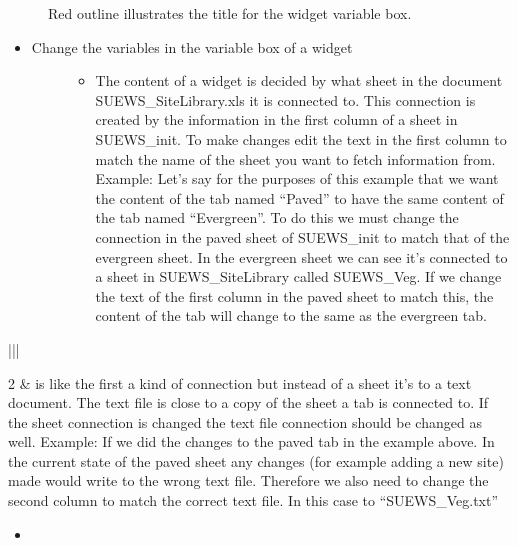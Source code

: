 \documentclass[letterpaper,10pt,english]{sphinxmanual}
\begin{document}
\begin{figure}[htbp]
\centering
\capstart

\noindent{}
\caption{Red outline illustrates the title for the widget variable box.}\label{\detokenize{DevelopmentGuidelines:id6}}\end{figure}
\begin{itemize}
\item {} \begin{description}
\item[{Change the variables in the variable box of a widget}] \leavevmode\begin{itemize}
\item {} 
The content of a widget is decided by what sheet in the document SUEWS\_SiteLibrary.xls it is connected to. This connection is created by the information in the first column of a sheet in SUEWS\_init. To make changes edit the text in the first column to match the name of the sheet you want to fetch information from. Example: Let’s say for the purposes of this example that we want the content of the tab named “Paved” to have the same content of the tab named “Evergreen”. To do this we must change the connection in the paved sheet of SUEWS\_init to match that of the evergreen sheet. In the evergreen sheet we can see it’s connected to a sheet in SUEWS\_SiteLibrary called SUEWS\_Veg. If we change the text of the first column in the paved sheet to match this, the content of the tab will change to the same as the evergreen tab. 

\end{itemize}

\end{description}

\end{itemize}


\begin{savenotes}\sphinxattablestart
\centering
\begin{tabular}[t]{|||}
\hline

2
&
is like the first a kind of connection but instead of a sheet it’s to a text document. The text file is close to a copy of the sheet a tab is connected to. If the sheet connection is changed the text file connection should be changed as well. Example: If we did the changes to the paved tab in the example above. In the current state of the paved sheet any changes (for example adding a new site) made would write to the wrong text file. Therefore we also need to change the second column to match the correct text file. In this case to “SUEWS\_Veg.txt”
\\
\hline
\end{tabular}
\par
\sphinxattableend\end{savenotes}
\begin{itemize}
\item {} 

\end{itemize}
\end{document}
